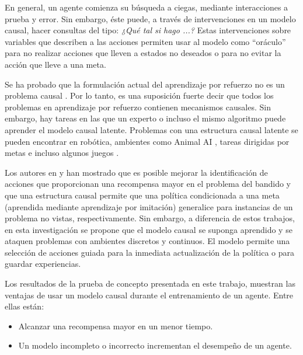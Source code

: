 En general, un agente comienza su búsqueda a ciegas,
mediante interacciones a prueba y error.
Sin embargo, éste puede, a través de intervenciones
en un modelo causal, hacer consultas del tipo: \textit{¿Qué tal si hago ...?} Estas intervenciones sobre variables 
que describen a las acciones permiten usar al modelo
como ``oráculo'' para no realizar acciones que lleven
a estados no deseados o para no evitar la acción que
lleve a una meta.

Se ha probado que la formulación actual del aprendizaje
por refuerzo no es un problema causal \cite{gonzalez2019reinforcement}.
Por lo tanto, es una suposición fuerte 
decir que todos los problemas 
en aprendizaje por refuerzo contienen mecanismos causales. 
Sin embargo, hay tareas en las
que un experto o incluso el mismo algoritmo puede
aprender el modelo causal latente.
Problemas con una estructura causal latente
se pueden encontrar en robótica, ambientes como Animal AI \cite{beyret2019animalai}, 
tareas dirigidas por metas \cite{nair2019causal} e
incluso algunos juegos \cite{madumal2019explainable}.



Los autores en  \cite{lattimore2016causal} y \cite{nair2019causal} han mostrado
que es posible mejorar la identificación de acciones que proporcionan una recompensa mayor en
el problema del bandido y 
que una estructura causal permite
que una política condicionada a una
meta (aprendida mediante aprendizaje por imitación) generalice para instancias de 
un problema no vistas, respectivamente.
Sin embargo, a diferencia de estos trabajos,
en esta investigación 
se propone que el modelo causal se suponga 
aprendido y se ataquen problemas con ambientes discretos 
y continuos. El modelo permite una selección de acciones 
guiada para la inmediata actualización de la política
o para guardar experiencias.

Los resultados de la prueba de concepto presentada en este trabajo, 
muestran las ventajas de usar un modelo causal durante el entrenamiento de un agente. Entre ellas están: 
\begin{itemize}
    \item Alcanzar una recompensa mayor en un menor tiempo.
    \item Un modelo incompleto o incorrecto incrementan el desempeño de un agente.
\end{itemize}

